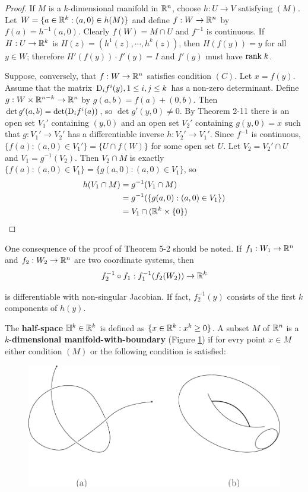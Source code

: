 \begin{proof}
    If $M$ is a $k$-dimensional manifold in $\mathbb{R}^n$, choose $h:U\to V$ satisfying $(M)$. Let 
    $W=\{a\in\mathbb{R}^k:(a,0)\in h(M)\}$ and define $f:W\to\mathbb{R}^n$ by $f(a)=h^{-1}(a,0)$. Clearly 
    $f(W)=M\cap U$ and $f^{-1}$ is continuous. If $H:U\to\mathbb{R}^k$ is $H(z)=(h^1(z),\cdots,h^k(z))$,
    then $H(f(y))=y$ for all $y\in W$; therefore $H'(f(y))\cdot f'(y)=I$ and $f'(y)$ must have 
    $\mathrm{rank}\; k$.

    Suppose, conversely, that $f:W\to\mathbb{R}^n$ satisfies condition $(C)$. Let $x=f(y)$. Assume that 
    the matrix $\mathrm{D}_if^i(y), 1\le i,j\le k$ has a non-zero determinant. Define $g:W\times \mathbb{R}^{n-k}\to\mathbb{R}^n$
    by $g(a,b)=f(a)+(0,b)$. Then $\det g'(a,b)=\det(\mathrm{D}_if^i(a))$, so $\det g'(y,0)\neq 0$. By Theorem 2-11
    there is an open set $V_1'$ containing $(y,0)$ and an open set $V_2'$ containing $g(y,0)=x$ such that
    $g:V_1'\to V_2'$ has a differentiable inverse $h:V_2'\to V_1'$. Since $f^{-1}$ is continuous, 
    $\{f(a):(a,0)\in V_1'\} = \{U\cap f(W)\}$ for some open set $U$. Let $V_2=V_2'\cap U$ and $V_1=g^{-1}(V_2)$.
    Then $V_2\cap M$ is exactly $\{f(a):(a,0)\in V_1\} = \{g(a,0):(a,0)\in V_1\}$, so 
    \begin{align*}
        h(V_1\cap M) 
        & = g^{-1}(V_1\cap M) \\
        & = g^{-1}(\{g(a,0):(a,0)\in V_1\}) \\
        & = V_1\cap (\mathbb{R}^k\times \{0\})
    \end{align*} 
\end{proof}

One consequence of the proof of Theorem 5-2 should be noted. If $f_1:W_1\to\mathbb{R}^n$ and 
$f_2:W_2\to \mathbb{R}^n$ are two coordinate systems, then 
\begin{align*}
    f_2^{-1}\circ f_1:f_1^{-1}(f_2(W_2))\to \mathbb{R}^k
\end{align*}

is differentiable with non-singular Jacobian. If fact, $f_2^{-1}(y)$ consists of the first
$k$ components of $h(y)$.

The \textbf{half-space} $\mathbb{H}^k\in\mathbb{R}^k$ is defined as $\{x\in\mathbb{R}^k:x^k\ge 0\}$. A subset 
$M$ of $\mathbb{R}^n$ is a $k$-\textbf{dimensional manifold-with-boundary} (Figure \ref{Fig 5-3}) if for evry point 
$x\in M$ either condition $(M)$ or the following condition is satisfied:

\begin{figure}[!htb]
    \centering
    \includegraphics[width=.75\linewidth]{./pics/Fig5-3.pdf}
    \caption{}
    \label{Fig 5-3}
\end{figure}

